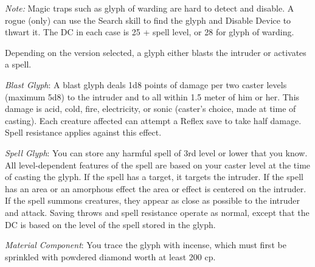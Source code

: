 {	\textit{Note:} Magic traps such as glyph of warding are hard to detect and disable. A rogue (only) can use the Search skill to find the glyph and Disable Device to thwart it. The DC in each case is 25 + spell level, or 28 for glyph of warding.

	Depending on the version selected, a glyph either blasts the intruder or activates a spell.

	\textit{Blast Glyph}:
	A blast glyph deals 1d8 points of damage per two caster levels (maximum 5d8) to the intruder and to all within 1.5 meter of him or her. This damage is acid, cold, fire, electricity, or sonic (caster's choice, made at time of casting). Each creature affected can attempt a Reflex save to take half damage. Spell resistance applies against this effect.

	\textit{Spell Glyph}:
	You can store any harmful spell of 3rd level or lower that you know. All level-dependent features of the spell are based on your caster level at the time of casting the glyph. If the spell has a target, it targets the intruder. If the spell has an area or an amorphous effect the area or effect is centered on the intruder. If the spell summons creatures, they appear as close as possible to the intruder and attack. Saving throws and spell resistance operate as normal, except that the DC is based on the level of the spell stored in the glyph.

	\textit{Material Component}:
	You trace the glyph with incense, which must first be sprinkled with powdered diamond worth at least 200 cp.

}
